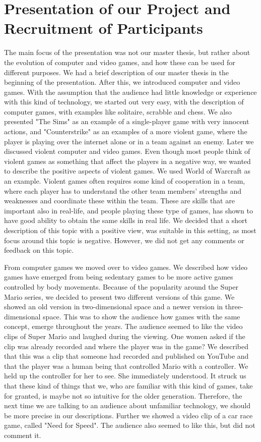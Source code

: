 \section{Presentation of our Project and Recruitment of Participants}
The main focus of the presentation was not our master thesis, but rather about the evolution of computer and video games, and how these can be used for different purposes. We had a brief description of our master thesis in the beginning of the presentation. After this, we introduced computer and video games. With the assumption that the audience had little knowledge or experience with this kind of technology, we started out very easy, with the description of computer games, with examples like solitaire, scrabble and chess. We also presented "The Sims" as an example of a single-player game with very innocent actions, and "Counterstrike" as an examples of a more violent game, where the player is playing over the internet alone or in a team against an enemy. Later we discussed violent computer and video games. Even though most people think of violent games as something that affect the players in a negative way, we wanted to describe the positive aspects of violent games. We used World of Warcraft as an example. Violent games often requires some kind of cooperation in a team, where each player has to understand the other team members' strengths and weaknesses and coordinate these within the team. These are skills that are important also in real-life, and people playing these type of games, has shown to have good ability to obtain the same skills in real life. We decided that a short description of this topic with a positive view, was suitable in this setting, as most focus around this topic is negative. However, we did not get any comments or feedback on this topic. 

From computer games we moved over to video games. We described how video games have emerged from being sedentary games to be more active games controlled by body movements. Because of the popularity around the Super Mario series, we decided to present two different versions of this game. We showed an old version in two-dimensional space and a newer version in three-dimensional space. This was to show the audience how games with the same concept, emerge throughout the years. The audience seemed to like the video clips of Super Mario and laughed during the viewing. One women asked if the clip was already recorded and where the player was in the game? We described that this was a clip that someone had recorded and published on YouTube and that the player was a human being that controlled Mario with a controller. We held up the controller for her to see. She immediately understood. It struck us that these kind of things that we, who are familiar with this kind of games, take for granted, is maybe not so intuitive for the older generation. Therefore, the next time we are talking to an audience about unfamiliar technology, we should be more precise in our descriptions. Further we showed a video clip of a car race game, called "Need for Speed". The audience also seemed to like this, but did not comment it. 

